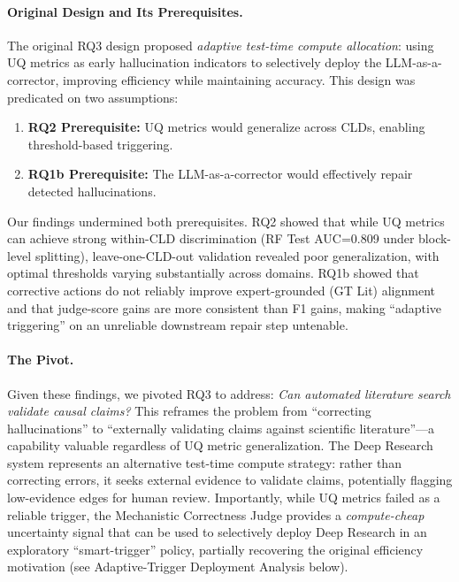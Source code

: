 \paragraph{Original Design and Its Prerequisites.}
The original RQ3 design proposed \textit{adaptive test-time compute allocation}: using UQ metrics as early hallucination indicators to selectively deploy the LLM-as-a-corrector, improving efficiency while maintaining accuracy. This design was predicated on two assumptions:
\begin{enumerate}[noitemsep]
    \item \textbf{RQ2 Prerequisite:} UQ metrics would generalize across CLDs, enabling threshold-based triggering.
    \item \textbf{RQ1b Prerequisite:} The LLM-as-a-corrector would effectively repair detected hallucinations.
\end{enumerate}

\noindent Our findings undermined both prerequisites. RQ2 showed that while UQ metrics can achieve strong within-CLD discrimination (RF Test AUC=0.809 under block-level splitting), leave-one-CLD-out validation revealed poor generalization, with optimal thresholds varying substantially across domains. RQ1b showed that corrective actions do not reliably improve expert-grounded (GT Lit) alignment and that judge-score gains are more consistent than F1 gains, making ``adaptive triggering'' on an unreliable downstream repair step untenable.

\paragraph{The Pivot.}
Given these findings, we pivoted RQ3 to address: \textit{Can automated literature search validate causal claims?} This reframes the problem from ``correcting hallucinations'' to ``externally validating claims against scientific literature''---a capability valuable regardless of UQ metric generalization. The Deep Research system represents an alternative test-time compute strategy: rather than correcting errors, it seeks external evidence to validate claims, potentially flagging low-evidence edges for human review. Importantly, while UQ metrics failed as a reliable trigger, the Mechanistic Correctness Judge provides a \textit{compute-cheap} uncertainty signal that can be used to selectively deploy Deep Research in an exploratory ``smart-trigger'' policy, partially recovering the original efficiency motivation (see Adaptive-Trigger Deployment Analysis below).


